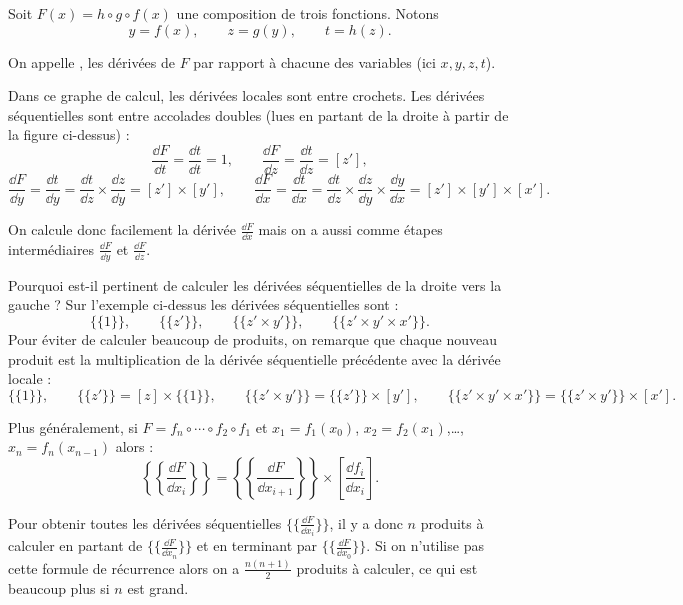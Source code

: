 \documentclass[11pt,class=report,crop=false]{standalone}
\begin{document}
Soit $F(x) = h\circ g \circ f(x)$ une composition de trois fonctions. Notons
$$y=f(x), \qquad z = g(y), \qquad t = h(z).$$

On appelle , les dérivées de $F$ par rapport à chacune des variables (ici $x,y,z,t$).


Dans ce graphe de calcul, les dérivées locales sont entre crochets.
Les dérivées séquentielles sont entre accolades doubles (lues en partant de la droite à partir de la figure ci-dessus) :
$$\frac{\dd F}{\dd t} = \frac{\dd t}{\dd t} = 1,
\qquad
\frac{\dd F}{\dd z} = \frac{\dd t}{\dd z} = [z'],
$$
$$
\frac{\dd F}{\dd y} = \frac{\dd t}{\dd y} = \frac{\dd t}{\dd z}\times\frac{\dd z}{\dd y}  = [z'] \times [y'],
\qquad
\frac{\dd F}{\dd x} = \frac{\dd t}{\dd x} = \frac{\dd t}{\dd z}\times\frac{\dd z}{\dd y}\times\frac{\dd y}{\dd x}  = [z'] \times [y'] \times [x'].
$$

On calcule donc facilement la dérivée $\frac{\dd F}{\dd x}$ mais on a aussi comme étapes intermédiaires $\frac{\dd F}{\dd y}$ et $\frac{\dd F}{\dd z}$.


Pourquoi est-il pertinent de calculer les dérivées séquentielles de la droite vers la gauche ?
Sur l'exemple ci-dessus les dérivées séquentielles sont :
$$ \{\{1\}\},
\qquad 
 \{\{z'\}\},
\qquad 
 \{\{z' \times y' \}\} ,
\qquad 
 \{\{z' \times y' \times x'\}\}.$$
Pour éviter de calculer beaucoup de produits, on remarque que chaque nouveau produit est la multiplication de la dérivée séquentielle précédente avec la dérivée locale :
$$ \{\{1\}\},
\qquad 
 \{\{z'\}\} = [z] \times \{\{1\}\},
\qquad 
 \{\{z' \times y' \}\} =  \{\{z'\}\}\times [y'],
\qquad 
 \{\{z' \times y' \times x'\}\} = \{\{z' \times y' \}\}\times [x'].$$

\bigskip 
Plus généralement, si $F = f_n\circ \cdots \circ f_2 \circ f_1$ et $x_1 = f_1(x_0)$, $x_2 = f_2(x_1)$,\ldots, $x_n = f_n(x_{n-1})$ alors :
$$ \left\{\left\{\frac{\dd F}{\dd x_i} \right\}\right\} =  \left\{\left\{\frac{\dd F}{\dd x_{i+1}} \right\}\right\} \times \left[\frac{\dd f_i}{\dd x_{i}}\right].$$

Pour obtenir toutes les dérivées séquentielles $\{\{\frac{\dd F}{\dd x_i} \}\}$, il y a donc $n$ produits à calculer en partant de $\{\{\frac{\dd F}{\dd x_n} \}\}$ et en terminant par $\{\{\frac{\dd F}{\dd x_0} \}\}$. Si on n'utilise pas cette formule de récurrence alors on a $\frac{n(n+1)}{2}$ produits à calculer, ce qui est beaucoup plus si $n$ est grand.
\end{document}
